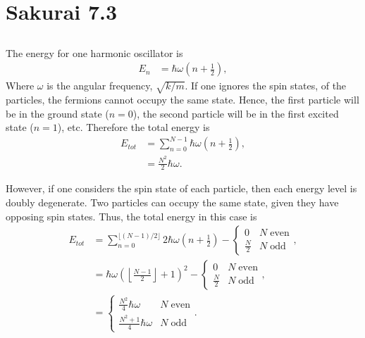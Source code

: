 \documentclass[
a4paper,
10pt,
twoside,
]{article}
\begin{document}
{}
\maketitle
\startmcols

\section{Sakurai 7.3}\label{sec: I}


\subsection{} \label{ssec: IA}


The energy for one harmonic oscillator is
\begin{align}
	E_n &= \hbar \omega \left(n+\frac{1}{2}\right),
\end{align}
Where $\omega$ is the angular frequency, $\sqrt{k/m}$.
If one ignores the spin states, of the particles, the fermions cannot occupy the same state.
Hence, the first particle will be in the ground state ($n=0$), the second particle will be in the first excited state ($n=1$), etc.
Therefore the total energy is
\begin{align}
	E_{tot} &= \sum_{n=0}^{N-1} \hbar\omega\left(n + \frac{1}{2}\right),\\
	&= \frac{N^2}{2}\hbar\omega.
\end{align}

However, if one considers the spin state of each particle, then each energy level is doubly degenerate.
Two particles can occupy the same state, given they have opposing spin states.
Thus, the total energy in this case is
\begin{align}
	E_{tot} &= \sum_{n=0}^{\lfloor(N-1)/2\rfloor} 2\hbar\omega\left(n+\frac{1}{2}\right)-\left\{
		\begin{array}{rl}
			0 & N\;\text{even}\\
			\frac{N}{2} & N\;\text{odd}
		\end{array}\right.,\\
	&= \hbar\omega\left(\left\lfloor\frac{N-1}{2}\right\rfloor+1\right)^2-\left\{\begin{array}{rl}
		0 & N\;\text{even}\\
		\frac{N}{2} & N\;\text{odd}
	\end{array}\right.,\\
	&= \left\{\begin{array}{rl}
		\frac{N^2}{4}\hbar\omega & N\;\text{even}\\
		\frac{N^2+1}{4}\hbar\omega & N\;\text{odd}
	\end{array}\right..
\end{align}
\end{document}
